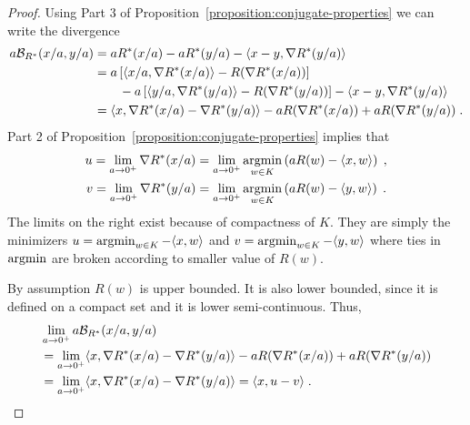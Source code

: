 \begin{proof}
Using Part 3 of Proposition~\ref{proposition:conjugate-properties} we can write
the divergence
\begin{align*}
a \mathcal{B}_{R^*}(x/a, y/a) & = a R^*(x/a) - a R^*(y/a) - \langle x - y, \nabla R^*(y/a) \rangle \\
& =
 a \left[ \langle x/a, \nabla R^*(x/a) \rangle - R(\nabla R^*(x/a)) \right] \\
& \qquad - a \left[ \langle y/a, \nabla R^*(y/a) \rangle - R(\nabla R^*(y/a)) \right]
- \langle x - y, \nabla R^*(y/a) \rangle \\
& =
\langle x, \nabla R^*(x/a) - \nabla R^*(y/a) \rangle - a R(\nabla R^*(x/a))
+ a R(\nabla R^*(y/a)) \; .
\end{align*}
Part 2 of Proposition~\ref{proposition:conjugate-properties} implies that
\begin{align*}
u = \lim_{a \to 0^+} \nabla R^*(x/a) & = \lim_{a \to 0^+} \operatorname*{argmin}_{w \in K} \left( a R(w) - \langle x, w \rangle \right) \; , \\
v = \lim_{a \to 0^+} \nabla R^*(y/a) & = \lim_{a \to 0^+} \operatorname*{argmin}_{w \in K} \left( a R(w) - \langle y, w \rangle \right) \; .
\end{align*}
The limits on the right exist because of compactness of $K$. They are simply
the minimizers $u= \operatorname*{argmin}_{w \in K} - \langle x, w \rangle$ and $v= \operatorname*{argmin}_{w
\in K} - \langle y, w \rangle$ where ties in $\operatorname*{argmin}$ are broken according to
smaller value of $R(w)$.

By assumption $R(w)$ is upper bounded. It is also lower bounded, since it is
defined on a compact set and it is lower semi-continuous. Thus,
\begin{align*}
& \lim_{a \to 0^+} a \mathcal{B}_{R^*}(x/a, y/a) \\
& = \lim_{a \to 0^+} \langle x, \nabla R^*(x/a) - \nabla R^*(y/a) \rangle - a R(\nabla R^*(x/a)) + a R(\nabla R^*(y/a)) \\
& = \lim_{a \to 0^+} \langle x, \nabla R^*(x/a) - \nabla R^*(y/a) \rangle = \langle x, u - v \rangle \; .
\end{align*}
\end{proof}
